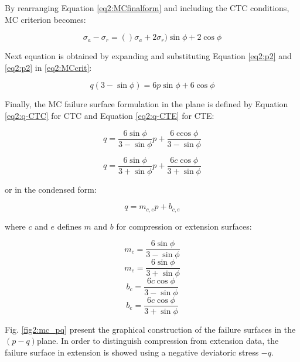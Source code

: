 By rearranging Equation \ref{eq2:MCfinalform} and including the CTC conditions, MC criterion becomes:

\begin{equation}\label{eq2:MCcrit}
    \sigma_a - \sigma_r = ()\sigma_a+2\sigma_r)\sin \phi + 2 \cos \phi
\end{equation}

Next equation is obtained by expanding and substituting Equation \ref{eq2:p2} and \ref{eq2:p2} in \ref{eq2:MCcrit}: 

\begin{equation}
    q(3-\sin \phi) = 6p \sin \phi + 6 \cos \phi
\end{equation}

Finally, the MC failure surface formulation in the  plane is defined by Equation \ref{eq2:q-CTC} for CTC and Equation \ref{eq2:q-CTE} for CTE:

\begin{equation}\label{eq2:q-CTC}
    q=\frac{6 \sin \phi}{3-\sin \phi} p+\frac{6 \operatorname{ccos} \phi}{3-\sin \phi} 
\end{equation}

\begin{equation}\label{eq2:q-CTE}
    q=\frac{6 \sin \phi}{3+\sin \phi} p+\frac{6 c \cos \phi}{3+\sin \phi}
\end{equation}

or in the condensed form: 

\begin{equation}\label{MC_q}
    q = m_{c,e} p + b_{c,e}
\end{equation}

where $c$ and $e$  defines $m$ and $b$ for compression or extension surfaces:

\begin{equation}\label{eq2:MC_mc_q}
    m_c=\frac{6 \sin \phi}{3-\sin \phi} 
\end{equation}
\begin{equation}\label{eq2:MC_me_q}
    m_e=\frac{6 \sin \phi}{3+\sin \phi} 
\end{equation}
\begin{equation}\label{eq2:MC_bc_q}
    b_c=\frac{6 c \cos \phi}{3-\sin \phi}
\end{equation}
\begin{equation}\label{eq2:MC_be_q}
    b_e=\frac{6 c \cos \phi}{3+\sin \phi}
\end{equation}

Fig. \ref{fig2:mc_pq} present the graphical construction of the failure surfaces in the  $(p-q)$plane. In order to distinguish compression from extension data, the failure surface in extension is showed using a negative deviatoric stress $-q$. 


